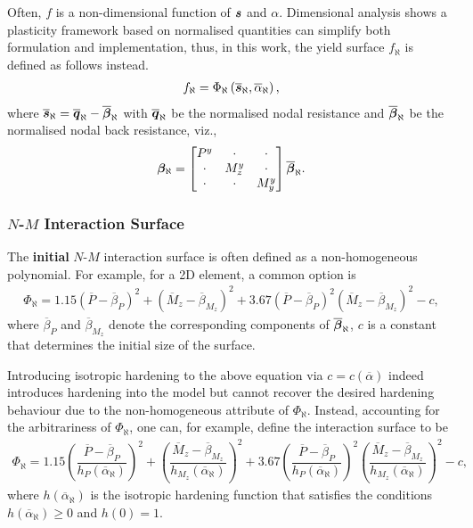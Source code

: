 Often, $f$ is a non-dimensional function of $\bm{s}$ and $\alpha$.
Dimensional analysis shows a plasticity framework based on normalised quantities can simplify both formulation and implementation, thus, in this work, the yield surface $f_\aleph$ is defined as follows instead.
\begin{gather}
f_\aleph=\Phi_\aleph\left(\bm{\overline{s}}_\aleph,\overline{\alpha}_\aleph\right),
\end{gather}
where $\bm{\overline{s}}_\aleph=\bm{\overline{q}}_\aleph-\overline{\bm{\beta}}_\aleph$ with $\bm{\overline{q}}_\aleph$ be the normalised nodal resistance  and $\overline{\bm{\beta}}_\aleph$ be the normalised nodal back resistance, viz.,
\begin{gather}
\bm{\beta}_\aleph=\begin{bmatrix}
P^y&\cdot&\cdot\\\cdot&M_z^y&\cdot\\\cdot&\cdot&M_y^y
\end{bmatrix}\overline{\bm{\beta}}_\aleph.
\end{gather}
\subsubsection{\texorpdfstring{$N$-$M$}{N-M} Interaction Surface}
The \textbf{initial} $N$-$M$ interaction surface is often defined as a non-homogeneous polynomial. For example, for a 2D element, a common option is
\begin{gather*}
\Phi_\aleph=1.15\left(\overline{P}-\overline{\beta}_P\right)^2+\left(\overline{M}_z-\overline{\beta}_{M_z}\right)^2+3.67\left(\overline{P}-\overline{\beta}_P\right)^2\left(\overline{M}_z-\overline{\beta}_{M_z}\right)^2-c,
\end{gather*}
where $\overline{\beta}_P$ and $\overline{\beta}_{M_z}$ denote the corresponding components of $\overline{\bm{\beta}}_\aleph$, $c$ is a constant that determines the initial size of the surface.

Introducing isotropic hardening to the above equation via $c=c\left(\overline{\alpha}\right)$ indeed introduces hardening into the model but cannot recover the desired hardening behaviour due to the non-homogeneous attribute of $\Phi_\aleph$.
Instead, accounting for the arbitrariness of $\Phi_\aleph$, one can, for example, define the interaction surface to be
\begin{gather}\label{eq:nm_surface_used}
\Phi_\aleph=
1.15\left(\dfrac{\overline{P}-\overline{\beta}_P}{h_P\left(\overline{\alpha}_\aleph\right)}\right)^2+
\left(\dfrac{\overline{M}_z-\overline{\beta}_{M_z}}{h_{M_z}\left(\overline{\alpha}_\aleph\right)}\right)^2+
3.67\left(\dfrac{\overline{P}-\overline{\beta}_P}{h_P\left(\overline{\alpha}_\aleph\right)}\right)^2\left(\dfrac{\overline{M}_z-\overline{\beta}_{M_z}}{h_{M_z}\left(\overline{\alpha}_\aleph\right)}\right)^2-c,
\end{gather}
where $h\left(\overline{\alpha}_\aleph\right)$ is the isotropic hardening function that satisfies the conditions $h\left(\overline{\alpha}_\aleph\right)\geqslant0$ and $h\left(0\right)=1$.

